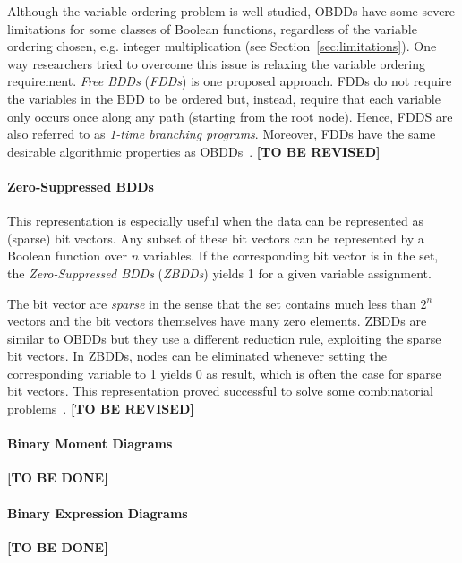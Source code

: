 \documentclass{vldb}
\newcommand{\tbr}{\textbf{[TO BE REVISED]}}
\newcommand{\tbd}{\textbf{[TO BE DONE]}}
\begin{document}
Although the variable ordering problem is well-studied, OBDDs have some severe
limitations for some classes of Boolean functions, regardless of the variable
ordering chosen, e.g. integer multiplication (see Section~\ref{sec:limitations}).
One way researchers tried to overcome this issue is relaxing the variable ordering
requirement. \textit{Free BDDs} (\textit{FDDs}) is one proposed approach. FDDs
do not require the variables in the BDD to be ordered but, instead, require that
each variable only occurs once along any path (starting from the root node).
Hence, FDDS are also referred to as \textit{1-time branching programs}. Moreover,
FDDs have the same desirable algorithmic properties as OBDDs~\cite{BRYANT95}. \tbr

\paragraph*{Zero-Suppressed BDDs}
\mbox{} %

This representation is especially useful when the data can be represented as
(sparse) bit vectors. Any subset of these bit vectors can be represented by a
Boolean function over $n$ variables. If the corresponding bit vector is in the
set, the \textit{Zero-Suppressed BDDs} (\textit{ZBDDs}) yields 1 for a given
variable assignment.

The bit vector are \textit{sparse} in the sense that the set contains much less
than $2^n$ vectors and the bit vectors themselves have many zero elements. ZBDDs
are similar to OBDDs but they use a different reduction rule, exploiting the
sparse bit vectors. In ZBDDs, nodes can be eliminated whenever setting the
corresponding variable to 1 yields 0 as result, which is often the case for sparse
bit vectors. This representation proved successful to solve some combinatorial
problems~\cite{BRYANT95}. \tbr

\paragraph*{Binary Moment Diagrams}
\mbox{} %

\tbd

\paragraph*{Binary Expression Diagrams}
\mbox{} %

\tbd

\balance



\end{document}
